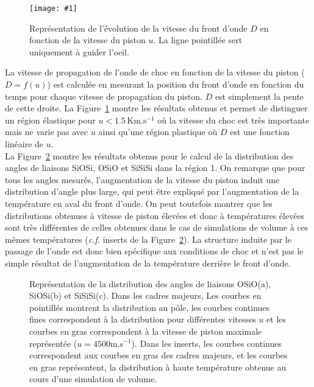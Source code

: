 \documentclass[aps,10pt,twocolumn]{revtex4}
\makeatletter
\newcommand{\cf}{\emph{c.f.}\@\xspace}
\newcommand{\mrm}[1]{\ensuremath{\mathrm{#1}}\xspace}
\newlength{\picW}	%
\newcommand{\picA}{270}	%
\newcommand{\picL}[1]{\texttt{[image: \#1]}}
\makeatother
\begin{document}
\begin{figure}
\picW=7cm
\picL{shockVelocity.ps}
\caption{Repr\'esentation de l'\'evolution de la vitesse du front d'onde $D$ en fonction de la
vitesse du piston $u$. La ligne pointill\'ee sert uniquement \`a guider l'oeil.}
\label{fig::shockVelocity}
\end{figure}

La vitesse de propagation de l'onde de choc en fonction de la vitesse du piston ($D=f(u)$) est
calcul\'ee en mesurant la position du front d'onde en fonction du temps  pour chaque vitesse
de propagation du piston. $D$ est simplement la pente de cette droite. La
Figure~\ref{fig::shockVelocity} montre les r\'esultats obtenus et permet de distinguer
un r\'egion \'elastique pour $u < 1.5\, \mrm{Km.s^{-1}}$ o\`u la vitesse du choc est tr\`es
importante mais ne varie pas avec $u$ ainsi qu'une r\'egion plastique o\`u $D$ est une fonction
lin\'eaire de $u$.\\

La Figure~\ref{fig::BAD_shock} montre les r\'esultats obtenus pour le calcul de la
distribution des angles de liaisons SiOSi, OSiO et SiSiSi dans la r\'egion 1. On remarque que
pour tous les angles mesur\'es, l'augmentation de la vitesse du piston  induit une distribution
d'angle plus large, qui peut \^etre expliqu\'e par l'augmentation de la temp\'erature en aval du
front d'onde. On peut toutefois montrer que les distributions obtenues \`a vitesse de piston
\'elev\'ees et donc \`a temp\'eratures \'elev\'ees sont tr\`es diff\'erentes de celles obtenues dans
le cas de simulations de volume \`a ces m\^emes temp\'eratures (\cf inserts de la
Figure~\ref{fig::BAD_shock}). La structure induite par le passage de l'onde  est donc bien
sp\'ecifique aux conditions de choc et n'est pas le simple r\'esultat de l'augmentation de la
temp\'erature derri\`ere le front d'onde. 
\begin{figure}
\picW=7cm
\subfigure[angle OSiO]{\picL{BAD_shock_OSiO.ps}}
\subfigure[angle SiOSi]{\picL{BAD_shock_SiOSi.ps}}
\subfigure[angle SiSiSi]{\picL{BAD_shock_SiSiSi.ps}}
\caption{Repr\'esentation de la distribution des angles de liaisons OSiO(a), SiOSi(b) et
SiSiSi(c). Dans les cadres majeurs, Les courbes en pointill\'es montrent la distribution au
p\^ole, les courbes continues fines correspondent \`a la distribution pour  diff\'erentes
vitesses $u$ et les courbes en gras  correspondent \`a la vitesse de piston maximale
repr\'esent\'ee ($u=4500 \mrm{m.s^{-1}}$). Dans les inserts, les courbes continues correspondent aux
courbes en gras des cadres majeurs, et les courbes en gras repr\'esentent, la distribution \`a haute
temp\'erature obtenue au cours d'une simulation de volume.}
\label{fig::BAD_shock}
\end{figure}
\end{document}
